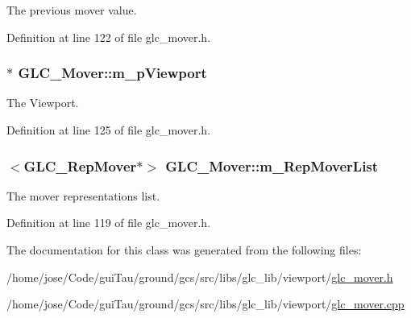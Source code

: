 The previous mover value. 



Definition at line 122 of file glc\-\_\-mover.\-h.

\hypertarget{class_g_l_c___mover_a9c48f31500f8968481b33d30e6694c85}{
\subsubsection[{m\-\_\-p\-Viewport}]{$\ast$ G\-L\-C\-\_\-\-Mover\-::m\-\_\-p\-Viewport\hspace{0.3cm}{\ttfamily [protected]}}}\label{class_g_l_c___mover_a9c48f31500f8968481b33d30e6694c85}


The Viewport. 



Definition at line 125 of file glc\-\_\-mover.\-h.

\hypertarget{class_g_l_c___mover_a25ce5c9b799eae3464346ac151047c6f}{
\subsubsection[{m\-\_\-\-Rep\-Mover\-List}]{$<${\bf G\-L\-C\-\_\-\-Rep\-Mover}$\ast$$>$ G\-L\-C\-\_\-\-Mover\-::m\-\_\-\-Rep\-Mover\-List\hspace{0.3cm}{\ttfamily [protected]}}}\label{class_g_l_c___mover_a25ce5c9b799eae3464346ac151047c6f}


The mover representations list. 



Definition at line 119 of file glc\-\_\-mover.\-h.



The documentation for this class was generated from the following files\-:\begin{DoxyCompactItemize}
\item 
/home/jose/\-Code/gui\-Tau/ground/gcs/src/libs/glc\-\_\-lib/viewport/\hyperlink{glc__mover_8h}{glc\-\_\-mover.\-h}\item 
/home/jose/\-Code/gui\-Tau/ground/gcs/src/libs/glc\-\_\-lib/viewport/\hyperlink{glc__mover_8cpp}{glc\-\_\-mover.\-cpp}\end{DoxyCompactItemize}
